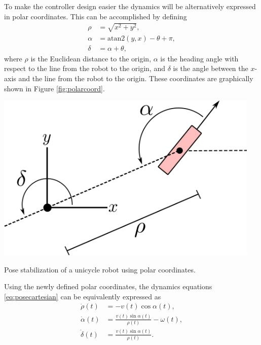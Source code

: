 \begin{example}
To make the controller design easier the dynamics will be alternatively expressed in polar coordinates. This can be accomplished by defining
\begin{equation} \label{eq:polarcoord}
\begin{split}
\rho &= \sqrt{x^2+y^2}, \\
\alpha &= \mathrm{atan2}(y, x) - \theta + \pi, \\
\delta &= \alpha + \theta,
\end{split}
\end{equation}
where $\rho$ is the Euclidean distance to the origin, $\alpha$ is the heading angle with respect to the line from the robot to the origin, and $\delta$ is the angle between the $x$-axis and the line from the robot to the origin. These coordinates are graphically shown in Figure \ref{fig:polarcoord}.
\begin{marginfigure}
\centering
\includegraphics[width=0.95\textwidth]{tex/figs/ch04_figs/unicycle_polar.png}
\caption{Pose stabilization of a unicycle robot using polar coordinates.}
\label{fig:polarcoord}
\end{marginfigure}
Using the newly defined polar coordinates, the dynamics equations \eqref{eq:posecartesian} can be equivalently expressed as
\begin{equation} \label{eq:posepolar}
\begin{split}
\dot{\rho}(t) &= -v(t) \cos\alpha(t), \\
\dot{\alpha}(t) &= \frac{v(t) \sin\alpha(t)}{\rho(t)} - \omega(t), \\
\dot{\delta}(t) &= \frac{v(t) \sin \alpha(t)}{\rho(t)}. \\
\end{split}
\end{equation}


\end{example}
